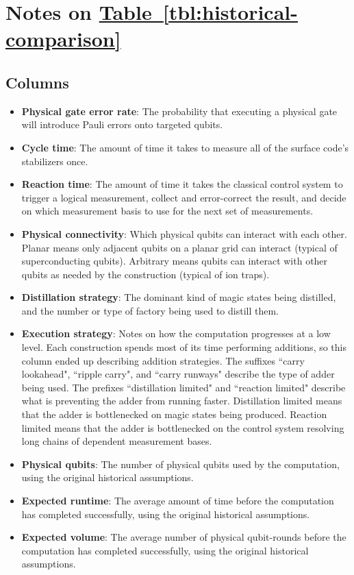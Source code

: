 \documentclass[a4paper, onecolumn, accepted=2021-03-29]{quantumarticle}
\newcommand{\tbl}[1]{\hyperref[tbl:#1]{Table~\ref*{tbl:#1}}}
\begin{document}
\section{Notes on \texorpdfstring{\tbl{historical-comparison}}{Table II}}
\label{app:historical-table-details}

\subsection{Columns}

\begin{itemize}
    \item \textbf{Physical gate error rate}:
        The probability that executing a physical gate will introduce Pauli errors onto targeted qubits.
    \item \textbf{Cycle time}:
        The amount of time it takes to measure all of the surface code's stabilizers once.
    \item \textbf{Reaction time}:
        The amount of time it takes the classical control system to trigger a logical measurement, collect and error-correct the result, and decide on which measurement basis to use for the next set of measurements.
    \item \textbf{Physical connectivity}:
        Which physical qubits can interact with each other.
        Planar means only adjacent qubits on a planar grid can interact (typical of superconducting qubits).
        Arbitrary means qubits can interact with other qubits as needed by the construction (typical of ion traps).
    \item \textbf{Distillation strategy}:
        The dominant kind of magic states being distilled, and the number or type of factory being used to distill them.
    \item \textbf{Execution strategy}:
        Notes on how the computation progresses at a low level.
        Each construction spends most of its time performing additions, so this column ended up describing addition strategies.
        The suffixes ``carry lookahead", ``ripple carry", and ``carry runways" describe the type of adder being used.
        The prefixes ``distillation limited" and ``reaction limited" describe what is preventing the adder from running faster.
        Distillation limited means that the adder is bottlenecked on magic states being produced.
        Reaction limited means that the adder is bottlenecked on the control system resolving long chains of dependent measurement bases.
    \item \textbf{Physical qubits}:
        The number of physical qubits used by the computation, using the original historical assumptions.
    \item \textbf{Expected runtime}:
        The average amount of time before the computation has completed successfully, using the original historical assumptions.
    \item \textbf{Expected volume}:
        The average number of physical qubit-rounds before the computation has completed successfully, using the original historical assumptions.
\end{itemize}
\end{document}
